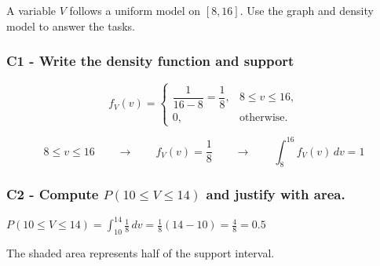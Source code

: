 	A variable $V$ follows a uniform model on $[8,16]$. Use the graph and density model to answer the tasks.
	
	
	\subsubsection*{C1 - Write the density function and support}
	\label{subsec:example-uniform-investment-plan-c1-a}
	
	\[
	f_V(v)=
	\begin{cases}
		\dfrac{1}{16-8}=\dfrac18, & 8\le v\le 16,\\
		0, & \text{otherwise.}
	\end{cases}
	\]
	
	\[
	8\le v\le 16
	\qquad \longrightarrow \qquad
	f_V(v)=\frac18
	\qquad \longrightarrow \qquad
	\int_8^{16} f_V(v)\,dv=1
	\]
	
	
	\subsubsection*{C2 - Compute $P(10\le V\le 14)$ and justify with area.}
	\label{subsec:example-uniform-investment-plan-c1-b}
	
	\begin{minipage}[t]{0.42\textwidth}
		\vspace{0pt}
		\centering
	\end{minipage}
	\hfill
	\begin{minipage}[t]{0.54\textwidth}
		\vspace{0pt}
		\centering
		
		\(\displaystyle
		P(10\le V\le 14)
		=\int_{10}^{14}\frac18\,dv
		=\frac18(14-10)
		=\frac48
		=0.5
		\)
		
		\par\vspace{2mm}
		
		The shaded area represents half of the support interval.
	\end{minipage}
	
	

